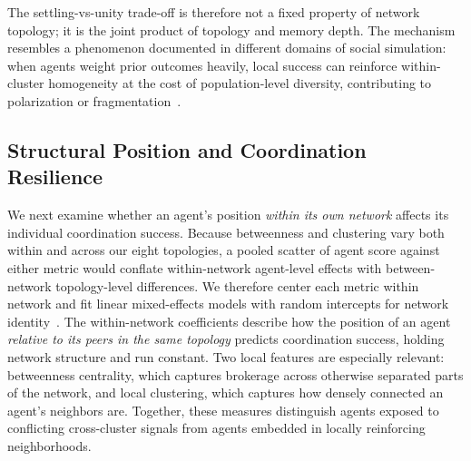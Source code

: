 \documentclass{article}
\begin{document}
The settling-vs-unity trade-off is therefore not a fixed property of network topology; it is the joint product of topology and memory depth. The mechanism resembles a phenomenon documented in different domains of social simulation: when agents weight prior outcomes heavily, local success can reinforce within-cluster homogeneity at the cost of population-level diversity, contributing to polarization or fragmentation~\cite{horn2026success}.

\subsection{Structural Position and Coordination Resilience}
\label{sec:structural_resilience}

We next examine whether an agent's position \emph{within its own network} affects its individual coordination success. Because betweenness and clustering vary both within and across our eight topologies, a pooled scatter of agent score against either metric would conflate within-network agent-level effects with between-network topology-level differences. We therefore center each metric within network and fit linear mixed-effects models with random intercepts for network identity~\cite{bates2015fitting}. The within-network coefficients describe how the position of an agent \emph{relative to its peers in the same topology} predicts coordination success, holding network structure and run constant. Two local features are especially relevant: betweenness centrality, which captures brokerage across otherwise separated parts of the network, and local clustering, which captures how densely connected an agent's neighbors are. Together, these measures distinguish agents exposed to conflicting cross-cluster signals from agents embedded in locally reinforcing neighborhoods.
\end{document}
